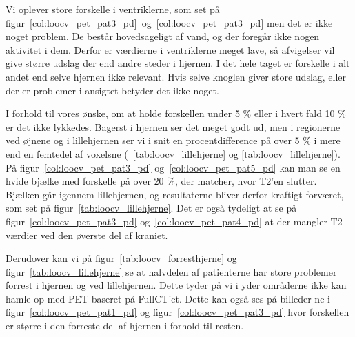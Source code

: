 Vi oplever store forskelle i ventriklerne, som set på figur~\ref{col:loocv_pet_pat3_pd}~og~\ref{col:loocv_pet_pat3_pd}  men det er ikke noget problem. De består hovedsageligt af vand, og der foregår ikke nogen aktivitet i dem. Derfor er værdierne i ventriklerne meget lave, så afvigelser vil give større udslag der end andre steder i hjernen. I det hele taget er forskelle i alt andet end selve hjernen ikke relevant. Hvis selve knoglen giver store udslag, eller der er problemer i ansigtet betyder det ikke noget.


I forhold til vores ønske, om at holde forskellen under 5 \% eller i hvert fald 10 \%  er det ikke lykkedes. Bagerst i hjernen ser det meget godt ud, men i regionerne ved øjnene og i lillehjernen ser vi i snit en procentdifference på over 5 \% i mere end en femtedel af voxelsne (~\ref{tab:loocv_lillehjerne} og \ref{tab:loocv_lillehjerne}). På figur~\ref{col:loocv_pet_pat3_pd} og~\ref{col:loocv_pet_pat5_pd}  kan man se en hvide bjælke med forskelle på over 20 \%, der matcher, hvor T2’en slutter. Bjælken går igennem lillehjernen, og resultaterne bliver derfor kraftigt forværet, som set på figur~\ref{tab:loocv_lillehjerne}. Det er også tydeligt at se på figur~\ref{col:loocv_pet_pat3_pd} og~\ref{col:loocv_pet_pat4_pd} at der mangler T2 værdier ved den øverste del af kraniet.


Derudover kan vi på figur~\ref{tab:loocv_forresthjerne} og figur~\ref{tab:loocv_lillehjerne} se at halvdelen af patienterne har store problemer forrest i hjernen og ved lillehjernen. Dette tyder på vi i yder områderne ikke kan hamle op med PET baseret på FullCT’et. Dette kan også ses på billeder ne i figur~\ref{col:loocv_pet_pat1_pd} og figur~\ref{col:loocv_pet_pat3_pd} hvor forskellen er større i den forreste del af hjernen i forhold til resten.


